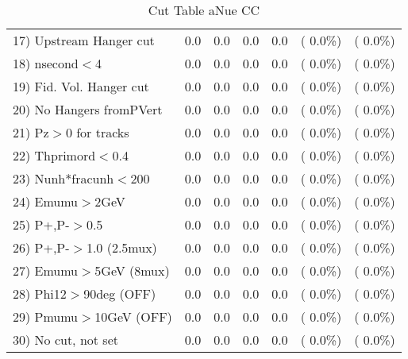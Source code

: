 \begin{table}[h!]
\begin{tabular}{||l||r|r|r|r|r|r||}
 17) Upstream Hanger cut  &          0.0 &          0.0 &          0.0 &          0.0 & (  0.0\%) & (  0.0\%) \\
 18) nsecond$<$4          &          0.0 &          0.0 &          0.0 &          0.0 & (  0.0\%) & (  0.0\%) \\
 19) Fid. Vol. Hanger cut &          0.0 &          0.0 &          0.0 &          0.0 & (  0.0\%) & (  0.0\%) \\
 20) No Hangers fromPVert &          0.0 &          0.0 &          0.0 &          0.0 & (  0.0\%) & (  0.0\%) \\
 21) Pz$>$0 for tracks    &          0.0 &          0.0 &          0.0 &          0.0 & (  0.0\%) & (  0.0\%) \\
 22) Thprimord$<$0.4      &          0.0 &          0.0 &          0.0 &          0.0 & (  0.0\%) & (  0.0\%) \\
 23) Nunh*fracunh$<$200   &          0.0 &          0.0 &          0.0 &          0.0 & (  0.0\%) & (  0.0\%) \\
 24) Emumu$>$2GeV         &          0.0 &          0.0 &          0.0 &          0.0 & (  0.0\%) & (  0.0\%) \\
 25) P+,P-$>$0.5          &          0.0 &          0.0 &          0.0 &          0.0 & (  0.0\%) & (  0.0\%) \\
 26) P+,P-$>$1.0 (2.5mux) &          0.0 &          0.0 &          0.0 &          0.0 & (  0.0\%) & (  0.0\%) \\
 27) Emumu$>$5GeV  (8mux) &          0.0 &          0.0 &          0.0 &          0.0 & (  0.0\%) & (  0.0\%) \\
 28) Phi12$>$90deg  (OFF) &          0.0 &          0.0 &          0.0 &          0.0 & (  0.0\%) & (  0.0\%) \\
 29) Pmumu$>$10GeV  (OFF) &          0.0 &          0.0 &          0.0 &          0.0 & (  0.0\%) & (  0.0\%) \\
 30) No cut, not set      &          0.0 &          0.0 &          0.0 &          0.0 & (  0.0\%) & (  0.0\%) \\
 \hline
 \hline
 \end{tabular}
 \caption{Cut Table  aNue CC  }
 \label{tab-cutheavy_neutrino_3.000}
 \end{table}
